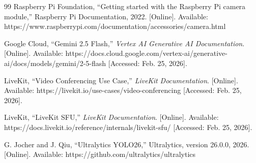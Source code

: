 \begin{thebibliography}{99}
Raspberry Pi Foundation,
``Getting started with the Raspberry Pi camera module,''
Raspberry Pi Documentation, 2022.
[Online]. Available: https://www.raspberrypi.com/documentation/accessories/camera.html

Google Cloud,
``Gemini 2.5 Flash,''
\emph{Vertex AI Generative AI Documentation}.
[Online]. Available: https://docs.cloud.google.com/vertex-ai/generative-ai/docs/models/gemini/2-5-flash
[Accessed: Feb. 25, 2026].

LiveKit,
``Video Conferencing Use Case,''
\emph{LiveKit Documentation}.
[Online]. Available: https://livekit.io/use-cases/video-conferencing
[Accessed: Feb. 25, 2026].

LiveKit,
``LiveKit SFU,''
\emph{LiveKit Documentation}.
[Online]. Available: https://docs.livekit.io/reference/internals/livekit-sfu/
[Accessed: Feb. 25, 2026].

G. Jocher and J. Qiu,
``Ultralytics YOLO26,''
Ultralytics, version 26.0.0, 2026.
[Online]. Available: https://github.com/ultralytics/ultralytics

\end{thebibliography}
